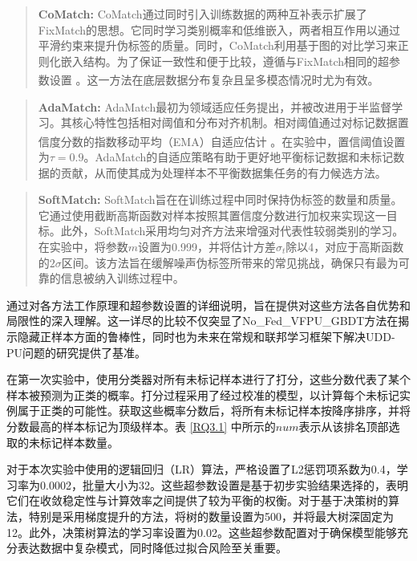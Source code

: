 \begin{quote}
	\textbf{CoMatch:} CoMatch通过同时引入训练数据的两种互补表示扩展了FixMatch的思想。它同时学习类别概率和低维嵌入，两者相互作用以通过平滑约束来提升伪标签的质量。同时，CoMatch利用基于图的对比学习来正则化嵌入结构。为了保证一致性和便于比较，遵循与FixMatch相同的超参数设置 \textsuperscript{\cite{sohn2020fixmatch}}。这一方法在底层数据分布复杂且呈多模态情况时尤为有效。
\end{quote}

\begin{quote}
	\textbf{AdaMatch:} AdaMatch最初为领域适应任务提出，并被改进用于半监督学习。其核心特性包括相对阈值和分布对齐机制。相对阈值通过对标记数据置信度分数的指数移动平均（EMA）自适应估计 \textsuperscript{\cite{tarvainen2017mean}}。在实验中，置信阈值设置为$\tau = 0.9$。AdaMatch的自适应策略有助于更好地平衡标记数据和未标记数据的贡献，从而使其成为处理样本不平衡数据集任务的有力候选方法。
\end{quote}

\begin{quote}
	\textbf{SoftMatch:} SoftMatch旨在在训练过程中同时保持伪标签的数量和质量。它通过使用截断高斯函数对样本按照其置信度分数进行加权来实现这一目标。此外，SoftMatch采用均匀对齐方法来增强对代表性较弱类别的学习。在实验中，将参数$m$设置为0.999，并将估计方差${{\hat \sigma }_t}$除以4，对应于高斯函数的$2\sigma$区间。该方法旨在缓解噪声伪标签所带来的常见挑战，确保只有最为可靠的信息被纳入训练过程中。
\end{quote}

通过对各方法工作原理和超参数设置的详细说明，旨在提供对这些方法各自优势和局限性的深入理解。这一详尽的比较不仅突显了No\_Fed\_VFPU\_GBDT方法在揭示隐藏正样本方面的鲁棒性，同时也为未来在常规和联邦学习框架下解决UDD-PU问题的研究提供了基准。


在第一次实验中，使用分类器对所有未标记样本进行了打分，这些分数代表了某个样本被预测为正类的概率。打分过程采用了经过校准的模型，以计算每个未标记实例属于正类的可能性。获取这些概率分数后，将所有未标记样本按降序排序，并将分数最高的样本标记为顶级样本。表 \ref{RQ3.1} 中所示的$ num $表示从该排名顶部选取的未标记样本数量。

对于本次实验中使用的逻辑回归（LR）算法，严格设置了L2惩罚项系数为0.4，学习率为0.0002，批量大小为32。这些超参数设置是基于初步实验结果选择的，表明它们在收敛稳定性与计算效率之间提供了较为平衡的权衡。对于基于决策树的算法，特别是采用梯度提升的方法，将树的数量设置为500，并将最大树深固定为12。此外，决策树算法的学习率设置为0.02。这些超参数配置对于确保模型能够充分表达数据中复杂模式，同时降低过拟合风险至关重要。

